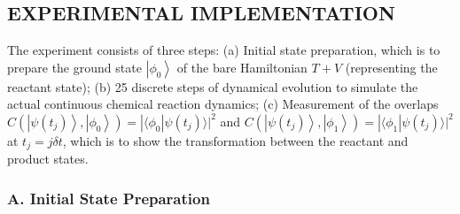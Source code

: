 \documentclass[twocolumn,showpacs,twoside,10pt,prl]{revtex4}
\newcommand{\la}{\langle}
\newcommand{\ra}{\rangle}
\begin{document}
\subsection*{EXPERIMENTAL IMPLEMENTATION}

The experiment consists of three steps: (a) Initial state preparation, which is to prepare the ground state $\left\vert \phi_{0} \right\rangle$ of the bare Hamiltonian $T+ {V}$ (representing the reactant state); (b) 25 discrete steps of dynamical evolution to simulate the actual continuous chemical reaction dynamics; (c) Measurement of the overlaps $C(\left\vert \psi(t_j) \right\rangle,\left\vert \phi_{0} \right\rangle)=| \la\phi_0|\psi(t_j)\ra |^2$ and $C(\left\vert \psi(t_j) \right\rangle,\left\vert \phi_{1} \right\rangle)=| \la\phi_1|\psi(t_j)\ra |^2$ at $t_j=j\delta t$, which is to show the transformation between the reactant and product states.

\subsubsection*{\textbf{A. Initial State Preparation}}
\end{document}
